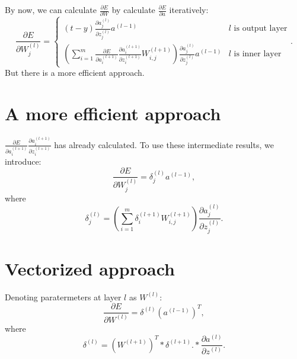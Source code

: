By now, we can calculate $\frac{\partial E}{\partial W}$ by calculate $\frac{\partial E}{\partial a}$ iteratively:
\[
	\frac{\partial E}{\partial W_j^{(l)}} =
		\begin{cases}
			(t - y) \frac {\partial a_j^{(l)}} {\partial z_j^{(l)}} a^{(l-1)} & l \textrm{ is output layer} \\
			( \sum_{i=1}^{m}
				\frac{\partial E }{\partial a_i^{(l+1)}}
				\frac{\partial a_i^{(l+1)} }{\partial z_i^{(l+1)}}
				W_{i,j}^{(l+1)}
			)
			\frac {\partial a_j^{(l)}} {\partial z_j^{(l)}} a^{(l-1)} & l \textrm{ is inner layer}
		\end{cases}
	.
\]
But there is a more efficient approach.

\section{A more efficient approach}
$\frac{\partial E }{\partial a_i^{(l+1)}} \frac{\partial a_i^{(l+1)} }{\partial z_i^{(l+1)}}$ has already calculated.
To use these intermediate results, we introduce:
\[
	\frac{\partial E}{\partial W_j^{(l)}} = \delta_j^{(l)} a^{(l-1)},
\]
where
\[
	\delta_j^{(l)} = (\sum_{i=1}^{m} \delta_i^{(l+1)} W_{i,j}^{(l+1)})
		\frac{\partial a_j^{(l)} }{\partial z_j^{(l)}}
		.
\]

\section{Vectorized approach}
Denoting paratermeters at layer $l$ as $W^{(l)}$:
\[
	\frac{\partial E}{\partial W^{(l)}} = \delta^{(l)} (a^{(l-1)})^T,
\]
where
\[
	\delta^{(l)} = (W^{(l+1)})^T * \delta^{(l+1)} .*
		\frac{\partial a^{(l)} }{\partial z^{(l)}}.
\]

